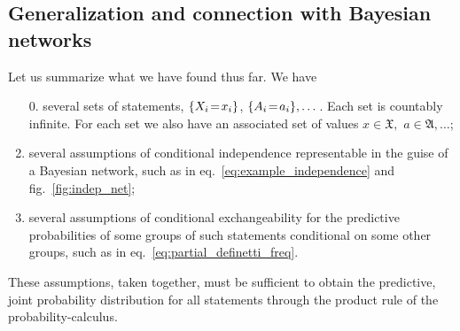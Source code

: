 \documentclass[\ifafour a4paper,12pt,\else a5paper,10pt,\fi%
onecolumn,oneside,article,%
british%
]{memoir}
\theoremstyle{remark}
\theoremstyle{innote}
\DeclarePairedDelimiter\set{\{}{\}}
\renewcommand*{\|}[1][]{\nonscript\,#1\vert\nonscript\,\mathopen{}}
\newcommand*{\eqn}{eq.}%
\newcommand*{\fig}{fig.}%
\renewcommand*{\=}{\TextOrMath\texteq\eq}
\newcommand*{\X}[1]{X_{#1}}
\newcommand*{\x}[1]{x_{#1}}
\newcommand*{\A}[1]{A_{#1}}
\newcommand*{\va}[1]{a_{#1}}
\newcommand*{\sX}{\mathfrak{X}}
\newcommand*{\sA}{\mathfrak{A}}
\begin{document}
\subsection{Generalization and connection with Bayesian networks}
\label{sec:graph_repr_gen}

Let us summarize what we have found thus far. We have
\begin{enumerate}[label=\roman*.]
\item[0.] several sets of statements, $\set{\X{i}\=\x{i}}$,
  $\set{\A{i}\=\va{i}},\dotsc$. Each set is countably infinite. For each
  set we also have an associated set of values $x\in \sX,$
  $a \in \sA, \dotsc$;
\item\label{item:assu_bayesnet} several assumptions of conditional independence representable in the
  guise of a Bayesian network, such as in
  \eqn~\eqref{eq:example_independence} and \fig~\ref{fig:indep_net};
\item\label{item:assu_condexch} several assumptions of conditional exchangeability for the predictive
  probabilities of some groups of such statements conditional on some other
  groups, such as in \eqn~\eqref{eq:partial_definetti_freq}.
\end{enumerate}
These assumptions, taken together, must be sufficient to obtain the
predictive, joint probability distribution for all statements through the
product rule of the probability-calculus.
\end{document}
